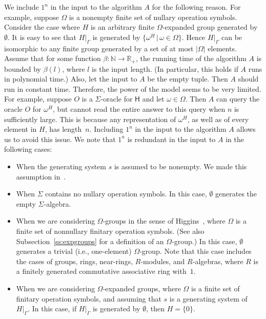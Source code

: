\documentclass{jgcc}
\newcommand{\bb}{\mathsf}
\newcommand{\st}{\,|\,}
\newcommand{\Add}[1]{#1|_\Gamma}
\newcommand{\acl}[1]{\lvert#1\rvert}
\newcommand{\N}{\mathbb N}
\newcommand{\R}{\mathbb R}
\begin{document}
We include $1^n$ in the input to the algorithm $A$ for the
following reason. For example, suppose $\Omega$ is a
nonempty finite set of nullary operation symbols. Consider
the case where $H$ is an arbitrary finite $\Omega$-expanded
group generated by~$\emptyset$. It is easy to see that $\Add
H$ is generated by $\{\omega^H\st\omega\in\Omega\}$. Hence
$\Add H$ can be isomorphic to any finite group generated by
a set of at most $\acl\Omega$ elements. Assume that for some
function $\beta\colon\N\to\R_+$, the running time of the
algorithm $A$ is bounded by $\beta(l)$, where $l$ is the
input length. (In particular, this holds if $A$ runs in
polynomial time.) Also, let the input to $A$ be the empty
tuple. Then $A$ should run in constant time. Therefore, the
power of the model seems to be very limited. For example,
suppose $O$ is a $\Sigma$-oracle for $\bb H$ and let
$\omega\in\Omega$. Then $A$ can query the oracle $O$ for
$\omega^H$, but cannot read the entire answer to this query
when $n$ is sufficiently large. This is because any
representation of $\omega^H$, as well as of every element in
$H$, has length~$n$. Including $1^n$ in the input to the
algorithm $A$ allows us to avoid this issue. We note that
$1^n$ is redundant in the input to $A$ in the following
cases:
\begin{itemize}
\item When the generating system $s$ is assumed to be
nonempty. We made this assumption in~\cite{Ano02}.

\item When $\Sigma$ contains no nullary operation symbols.
In this case, $\emptyset$ generates the empty
$\Sigma$-algebra.

\item When we are considering $\Omega$-groups in the sense
of Higgins~\cite[Section~2]{Hig56}, where $\Omega$ is a
finite set of nonnullary finitary operation symbols. (See
also Subsection~\ref{ss:expgroups} for a definition of an
$\Omega$-group.) In this case, $\emptyset$ generates a
trivial (i.e., one-element) $\Omega$-group. Note that this
case includes the cases of groups, rings, near-rings,
$R$-modules, and $R$-algebras, where $R$ is a finitely
generated commutative associative ring with~$1$.

\item When we are considering $\Omega$-expanded groups,
where $\Omega$ is a finite set of finitary operation
symbols, and assuming that $s$ is a generating system
of~$\Add H$. In this case, if $\Add H$ is generated by
$\emptyset$, then $H=\{0\}$.
\end{itemize}
\end{document}
